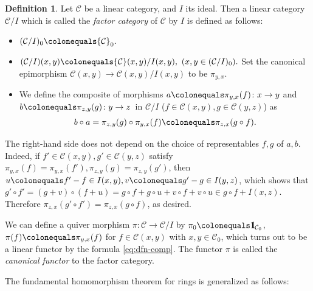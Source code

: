 \documentclass{surv-l}
\numberwithin{equation}{chapter}
\numberwithin{figure}{chapter}
\theoremstyle{plain}
\theoremstyle{definition}
\newtheorem{dfn}[thm]{Definition}
\theoremstyle{remark}
\newcommand{\id}{1\kern-.25em{\text{{\rm l}}}}
\begin{document}
\begin{dfn}
Let ${\mathcal{C}}$ be a linear category, and $I$ its ideal.
Then a linear category ${\mathcal{C}}/I$
which is called the \emph{factor category} of ${\mathcal{C}}$ by $I$ is defined as follows:
\begin{itemize}
\item
$({\mathcal{C}}/I)_0\colonequals  {\mathcal{C}}_0.$
\item
$
({\mathcal{C}}/I)(x, y)\colonequals  {\mathcal{C}}(x, y)/I(x, y),\ (x, y \in ({\mathcal{C}}/I)_0).
$
Set the canonical epimorphism ${\mathcal{C}}(x, y) \to {\mathcal{C}}(x, y)/I(x, y)$
to be $\pi_{y,x}$.
\item
We define the composite of morphisms $a\colonequals \pi_{y,x}(f) \colon x \to y$ and $b\colonequals \pi_{z,y}(g)\colon y \to z$\
in ${\mathcal{C}}/I$ ($f \in {\mathcal{C}}(x, y), g \in {\mathcal{C}}(y, z)$) as
\begin{equation}\label{eq:dfn-comp}
b \circ a = \pi_{z,y}(g) \circ \pi_{y,x}(f)\colonequals  \pi_{z,x}(g \circ f).
\end{equation}
\end{itemize}
The right-hand side does not depend on the choice of representables $f, g$
of $a, b$.
Indeed,
if $f' \in {\mathcal{C}}(x, y), g' \in {\mathcal{C}}(y, z)$ satisfy
$\pi_{y,x}(f) = \pi_{y,x}(f'), \pi_{z,y}(g) = \pi_{z,y}(g')$, then
$u\colonequals  f' - f \in I(x, y), v\colonequals  g' - g \in I(y, z)$, which shows that
$g' \circ f' = (g + v) \circ (f + u) = g \circ f + g \circ u + v \circ f + v \circ u \in g \circ f + I(x, z)$.
Therefore $\pi_{z,x}(g' \circ f') = \pi_{z,x}(g \circ f)$, as desired.

We can define a quiver morphism $\pi \colon {\mathcal{C}} \to {\mathcal{C}}/I$ by
$\pi_0\colonequals  \id_{{\mathcal{C}}_0}$,
$\pi(f)\colonequals  \pi_{y,x}(f)$ for $f \in {\mathcal{C}}(x, y)$ with $x, y \in {\mathcal{C}}_0$,
which turns out to be a linear functor by
the formula \eqref{eq:dfn-comp}.
The functor $\pi$ is called the \emph{canonical functor} to the factor category.
\end{dfn}

The fundamental homomorphism theorem for rings is generalized
as follows:
\end{document}
